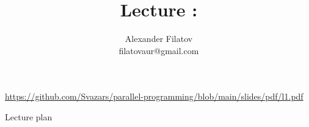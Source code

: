 


\title[]{Lecture \introNum: \introTopic}
\subtitle[]{\introKey}
\author[]{Alexander Filatov\\ filatovaur@gmail.com}

\date{}


\newcommand{\taskExceptions}{1.1}
\newcommand{\taskAmdhal}{1.2}
\newcommand{\taskEmpire}{1.3}
\newcommand{\taskJstack}{1.4}



\begin{frame}
  \titlepage
  \url{https://github.com/Svazars/parallel-programming/blob/main/slides/pdf/l1.pdf}
\end{frame}

\begin{frame}{Lecture plan}
\tableofcontents
\end{frame}


